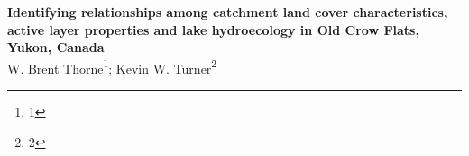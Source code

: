 \documentclass[article,30pt,extrafontsizes,showtrims]{memoir}
\begin{document}
\begin{shaded}
\begingroup
  \centering
  \huge\textbf{Identifying relationships among catchment land cover characteristics,
active layer properties and lake hydroecology in Old Crow Flats, Yukon,
Canada}\\[0.3in]
  \Large W. Brent Thorne\footnote{1}; Kevin W. Turner\footnote{2}\par
\endgroup
\vspace{1.2in}
  \end{shaded}
\end{document}
